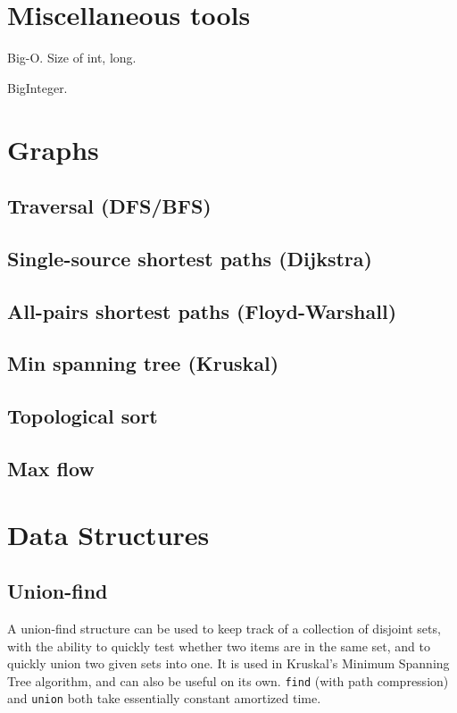\documentclass{article}
\begin{document}
\section{Miscellaneous tools}

Big-O.  Size of int, long.

BigInteger.


\section{Graphs}

\subsection{Traversal (DFS/BFS)}

\subsection{Single-source shortest paths (Dijkstra)}

\subsection{All-pairs shortest paths (Floyd-Warshall)}

\subsection{Min spanning tree (Kruskal)} \label{sec:kruskal}

\subsection{Topological sort}

\subsection{Max flow}

\section{Data Structures}

\subsection{Union-find}

A union-find structure can be used to keep track of a collection of
disjoint sets, with the ability to quickly test whether two items are
in the same set, and to quickly union two given sets into one.  It is
used in Kruskal's Minimum Spanning Tree algorithm, and can also be
useful on its own.  \texttt{find} (with path compression) and
\texttt{union} both take essentially constant amortized
time.
\end{document}

